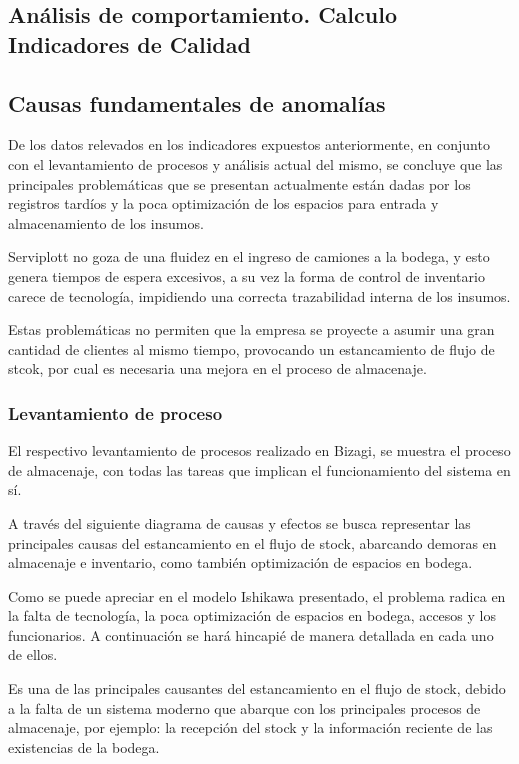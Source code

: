 	\subsection{Análisis de comportamiento. Calculo Indicadores de Calidad}
	
	
	\subsection{Causas fundamentales de anomalías}
	De los datos relevados en los indicadores expuestos anteriormente, en conjunto con el levantamiento de procesos y análisis actual del mismo, se concluye que las principales problemáticas que se presentan actualmente están dadas por los registros tardíos y la poca optimización de los espacios para entrada y almacenamiento de los insumos.
	
	
	Serviplott no goza de una fluidez en el ingreso de camiones a la bodega, y esto genera tiempos de espera excesivos, a su vez la forma de control de inventario carece de tecnología, impidiendo una correcta trazabilidad interna de los insumos.
	

Estas problemáticas no permiten que la empresa se proyecte a asumir una gran cantidad de clientes al mismo tiempo, provocando un estancamiento de flujo de stcok, por cual es necesaria una mejora en el proceso de almacenaje.
    \subsubsection{Levantamiento de proceso}
    El respectivo levantamiento de procesos realizado en Bizagi, se muestra el proceso de almacenaje, con todas las tareas que implican el funcionamiento del sistema en sí.

	A través del siguiente diagrama de causas y efectos se busca representar las
principales causas del estancamiento en el flujo de stock, abarcando demoras en
almacenaje e inventario, como también optimización de espacios en bodega.	


Como se puede apreciar en el modelo Ishikawa presentado, el problema radica en la
falta de tecnología, la poca optimización de espacios en bodega, accesos y los
funcionarios. A continuación se hará hincapié de manera detallada en cada uno de
ellos.

 Es una de las principales causantes del estancamiento en el flujo de stock, debido a la falta de un sistema moderno que abarque con los principales procesos de almacenaje, por ejemplo: la recepción del stock y la información reciente de las existencias de la bodega.

